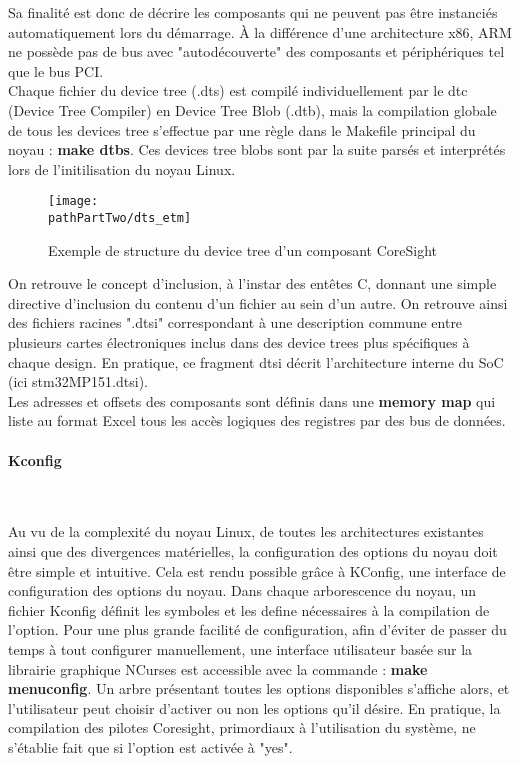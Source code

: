 Sa finalité est donc de décrire les composants qui ne peuvent pas être
instanciés automatiquement lors du démarrage. À la différence d'une
architecture x86, ARM ne possède pas de bus avec "autodécouverte" des
composants et périphériques tel que le bus PCI. \\

Chaque fichier du device tree (.dts) est compilé individuellement par le dtc
(Device Tree Compiler) en Device Tree Blob (.dtb), mais la compilation globale
de tous les devices tree s'effectue par une règle dans le Makefile principal
du noyau : \textbf{make dtbs}. Ces devices tree blobs sont par la suite parsés et
interprétés lors de l'initilisation du noyau Linux.

\begin{figure}[H]
	\begin{center}
		\texttt{[image: \\pathPartTwo/dts\_etm]}
		\caption{Exemple de structure du device tree d'un composant CoreSight}
	    \label{fig:dts_etm}
	\end{center}
\end{figure}

On retrouve le concept d'inclusion, à l'instar des entêtes C, donnant une
simple directive d'inclusion du contenu d'un fichier au sein d'un autre. On
retrouve ainsi des fichiers racines ".dtsi" correspondant à une description
commune entre plusieurs cartes électroniques inclus dans des device trees plus
spécifiques à chaque design. En pratique, ce fragment dtsi décrit
l'architecture interne du SoC (ici stm32MP151.dtsi). \\

Les adresses et offsets des composants sont définis dans une \textbf{memory
map} qui liste au format Excel tous les accès logiques des registres par des
bus de données. 

\paragraph{Kconfig}\mbox{}\\
\label{par:kconfig}

Au vu de la complexité du noyau Linux, de toutes les architectures existantes
ainsi que des divergences matérielles, la configuration des options du noyau
doit être simple et intuitive. Cela est rendu possible grâce à KConfig, une
interface de configuration des options du noyau. Dans chaque arborescence du
noyau, un fichier Kconfig définit les symboles et les define nécessaires à la
compilation de l'option. Pour une plus grande facilité de configuration, afin
d'éviter de passer du temps à tout configurer manuellement, une interface
utilisateur basée sur la librairie graphique NCurses est accessible avec la
commande : \textbf{make menuconfig}. Un arbre présentant toutes les options
disponibles s'affiche alors, et l'utilisateur peut choisir d'activer ou non
les options qu'il désire. En pratique, la compilation des pilotes Coresight,
primordiaux à l'utilisation du système, ne s'établie fait que si l'option est
activée à "yes".

